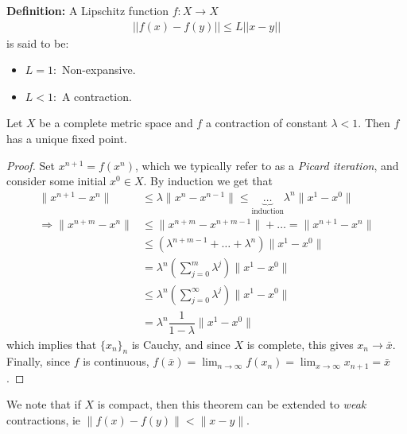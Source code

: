 \textbf{Definition:} A Lipschitz function $f:X\to X$
\begin{align*}
    ||f(x)-f(y)||\leq L||x-y||
\end{align*}
is said to be:
\begin{itemize}
    \item $L = 1:$ Non-expansive.
    \item $L<1:$ A contraction.
\end{itemize}

\begin{theorem}
 Let $X$ be a complete metric space and $f$ a contraction of constant $\lambda<1$. Then $f$ has a unique fixed point.

\begin{proof} Set $x^{n+1}=f(x^n)$, which we typically refer to as a \emph{Picard iteration}, and consider some initial $x^0\in X$. By induction we get that
\begin{align*}
     \|x^{n+1}-x^n\| &\leq \lambda \|x^n-x^{n-1}\|\leq \underbrace{\dots}_\text{induction} \lambda^n\|x^1-x^0\|\\
    \Rightarrow  \| x^{n+m}-x^n\| &\leq \|x^{n+m}-x^{n+m-1}\|+ \dots = \|x^{n+1}-x^n\|\\
    &\leq (\lambda ^{n+m-1}+\dots+\lambda^n)\|x^1-x^0\|\\
    &=\lambda^n\left(\displaystyle\sum_{j=0}^m\lambda^j\right)\|x^1-x^0\|\\
    &\leq\lambda^n\left(\displaystyle\sum_{j=0}^\infty\lambda^j\right)\|x^1-x^0\|\\
    &=\lambda^n\dfrac{1}{1-\lambda}\|x^1-x^0\|
\end{align*}
which implies that $\{x_n\}_n$ is Cauchy, and since $X$ is complete, this gives $x_n\to \bar{x}$. Finally, since $f$ is continuous, $f(\bar{x}) = \lim_{n\to \infty}f(x_n) = \lim_{x\to\infty}x_{n+1}=\bar{x}$.
\end{proof}
\end{theorem}

We note that if $X$ is compact, then this theorem can be extended to \textit{weak} contractions, ie $\|f(x)-f(y)\|< \|x-y\|$.


